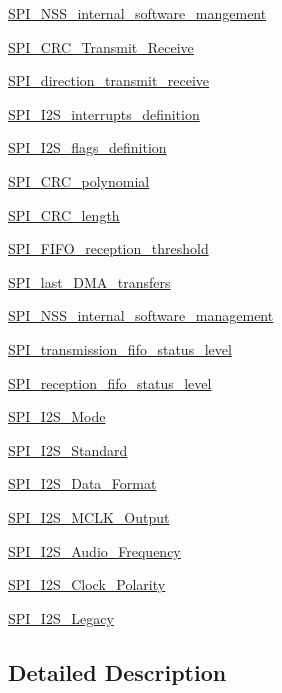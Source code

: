 \begin{DoxyCompactItemize}
\hyperlink{group___s_p_i___n_s_s__internal__software__mangement}{S\-P\-I\-\_\-\-N\-S\-S\-\_\-internal\-\_\-software\-\_\-mangement}
\item 
\hyperlink{group___s_p_i___c_r_c___transmit___receive}{S\-P\-I\-\_\-\-C\-R\-C\-\_\-\-Transmit\-\_\-\-Receive}
\item 
\hyperlink{group___s_p_i__direction__transmit__receive}{S\-P\-I\-\_\-direction\-\_\-transmit\-\_\-receive}
\item 
\hyperlink{group___s_p_i___i2_s__interrupts__definition}{S\-P\-I\-\_\-\-I2\-S\-\_\-interrupts\-\_\-definition}
\item 
\hyperlink{group___s_p_i___i2_s__flags__definition}{S\-P\-I\-\_\-\-I2\-S\-\_\-flags\-\_\-definition}
\item 
\hyperlink{group___s_p_i___c_r_c__polynomial}{S\-P\-I\-\_\-\-C\-R\-C\-\_\-polynomial}
\item 
\hyperlink{group___s_p_i___c_r_c__length}{S\-P\-I\-\_\-\-C\-R\-C\-\_\-length}
\item 
\hyperlink{group___s_p_i___f_i_f_o__reception__threshold}{S\-P\-I\-\_\-\-F\-I\-F\-O\-\_\-reception\-\_\-threshold}
\item 
\hyperlink{group___s_p_i__last___d_m_a__transfers}{S\-P\-I\-\_\-last\-\_\-\-D\-M\-A\-\_\-transfers}
\item 
\hyperlink{group___s_p_i___n_s_s__internal__software__management}{S\-P\-I\-\_\-\-N\-S\-S\-\_\-internal\-\_\-software\-\_\-management}
\item 
\hyperlink{group___s_p_i__transmission__fifo__status__level}{S\-P\-I\-\_\-transmission\-\_\-fifo\-\_\-status\-\_\-level}
\item 
\hyperlink{group___s_p_i__reception__fifo__status__level}{S\-P\-I\-\_\-reception\-\_\-fifo\-\_\-status\-\_\-level}
\item 
\hyperlink{group___s_p_i___i2_s___mode}{S\-P\-I\-\_\-\-I2\-S\-\_\-\-Mode}
\item 
\hyperlink{group___s_p_i___i2_s___standard}{S\-P\-I\-\_\-\-I2\-S\-\_\-\-Standard}
\item 
\hyperlink{group___s_p_i___i2_s___data___format}{S\-P\-I\-\_\-\-I2\-S\-\_\-\-Data\-\_\-\-Format}
\item 
\hyperlink{group___s_p_i___i2_s___m_c_l_k___output}{S\-P\-I\-\_\-\-I2\-S\-\_\-\-M\-C\-L\-K\-\_\-\-Output}
\item 
\hyperlink{group___s_p_i___i2_s___audio___frequency}{S\-P\-I\-\_\-\-I2\-S\-\_\-\-Audio\-\_\-\-Frequency}
\item 
\hyperlink{group___s_p_i___i2_s___clock___polarity}{S\-P\-I\-\_\-\-I2\-S\-\_\-\-Clock\-\_\-\-Polarity}
\item 
\hyperlink{group___s_p_i___i2_s___legacy}{S\-P\-I\-\_\-\-I2\-S\-\_\-\-Legacy}
\end{DoxyCompactItemize}


\subsection{Detailed Description}
